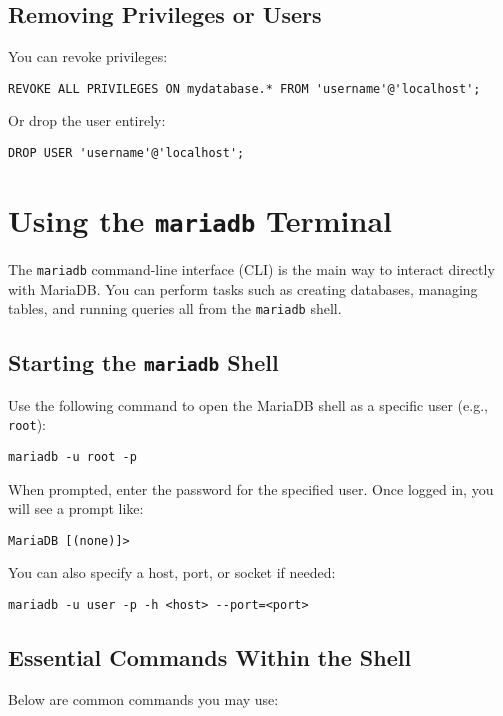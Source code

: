 \documentclass[10pt]{article}
\begin{document}
\subsection{Removing Privileges or Users}
You can revoke privileges:
\begin{lstlisting}
REVOKE ALL PRIVILEGES ON mydatabase.* FROM 'username'@'localhost';
\end{lstlisting}
Or drop the user entirely:
\begin{lstlisting}
DROP USER 'username'@'localhost';
\end{lstlisting}
\section{Using the \texttt{mariadb} Terminal}
The \texttt{mariadb} command-line interface (CLI) is the main way to interact directly with MariaDB. You can perform tasks such as creating databases, managing tables, and running queries all from the \texttt{mariadb} shell.

\subsection{Starting the \texttt{mariadb} Shell}
Use the following command to open the MariaDB shell as a specific user (e.g., \texttt{root}):
\begin{lstlisting}
mariadb -u root -p
\end{lstlisting}
When prompted, enter the password for the specified user. Once logged in, you will see a prompt like:
\begin{lstlisting}
MariaDB [(none)]>
\end{lstlisting}
You can also specify a host, port, or socket if needed:
\begin{lstlisting}
mariadb -u user -p -h <host> --port=<port>
\end{lstlisting}

\subsection{Essential Commands Within the Shell}
Below are common commands you may use:
\end{document}
